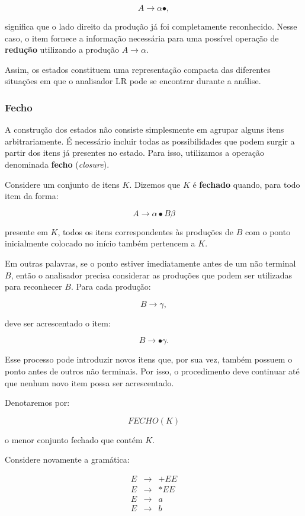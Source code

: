 \documentclass[
  brazilian,
  letterpaper,
]{book}
\theoremstyle{plain}
\theoremstyle{definition}
\theoremstyle{remark}
\begin{document}
\[
A\rightarrow\alpha\bullet,
\]

significa que o lado direito da produção já foi completamente
reconhecido. Nesse caso, o item fornece a informação necessária para uma
possível operação de \textbf{redução} utilizando a produção
\(A\rightarrow\alpha\).

Assim, os estados constituem uma representação compacta das diferentes
situações em que o analisador LR pode se encontrar durante a análise.

\subsubsection{Fecho}\label{fecho}

A construção dos estados não consiste simplesmente em agrupar alguns
itens arbitrariamente. É necessário incluir todas as possibilidades que
podem surgir a partir dos itens já presentes no estado. Para isso,
utilizamos a operação denominada \textbf{fecho} (\emph{closure}).

Considere um conjunto de itens \(K\). Dizemos que \(K\) é
\textbf{fechado} quando, para todo item da forma:

\[
A\rightarrow\alpha\bullet B\beta
\]

presente em \(K\), todos os itens correspondentes às produções de \(B\)
com o ponto inicialmente colocado no início também pertencem a \(K\).

Em outras palavras, se o ponto estiver imediatamente antes de um não
terminal \(B\), então o analisador precisa considerar as produções que
podem ser utilizadas para reconhecer \(B\). Para cada produção:

\[
B\rightarrow\gamma,
\]

deve ser acrescentado o item:

\[
B\rightarrow\bullet\gamma.
\]

Esse processo pode introduzir novos itens que, por sua vez, também
possuem o ponto antes de outros não terminais. Por isso, o procedimento
deve continuar até que nenhum novo item possa ser acrescentado.

Denotaremos por:

\[
FECHO(K)
\]

o menor conjunto fechado que contém \(K\).

Considere novamente a gramática:

\[
\begin{array}{rcl}
E &\rightarrow& +EE\\
E &\rightarrow& *EE\\
E &\rightarrow& a\\
E &\rightarrow& b
\end{array}
\]
\end{document}
